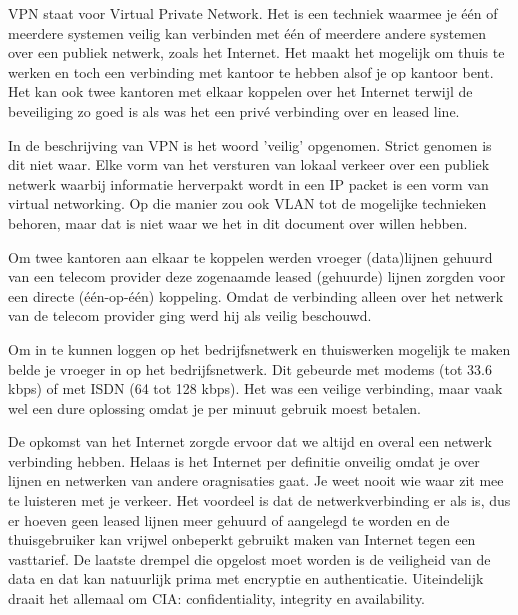VPN staat voor Virtual Private Network. Het is een techniek waarmee je \'e\'en of meerdere systemen veilig kan verbinden met \'e\'en of meerdere andere systemen over een publiek netwerk, zoals het Internet. Het maakt het mogelijk om thuis te werken en toch een verbinding met kantoor te hebben alsof je op kantoor bent. Het kan ook twee kantoren met elkaar koppelen over het Internet terwijl de beveiliging zo goed is als was het een priv\'e verbinding over en leased line.

In de beschrijving van VPN is het woord 'veilig' opgenomen. Strict genomen is dit niet waar. Elke vorm van het versturen van lokaal verkeer over een publiek netwerk waarbij informatie herverpakt wordt in een IP packet is een vorm van virtual networking. Op die manier zou ook VLAN tot de mogelijke technieken behoren, maar dat is niet waar we het in dit document over willen hebben.

Om twee kantoren aan elkaar te koppelen werden vroeger (data)lijnen gehuurd van een telecom provider deze zogenaamde leased (gehuurde) lijnen zorgden voor een directe (\'e\'en-op-\'e\'en) koppeling. Omdat de verbinding alleen over het netwerk van de telecom provider ging werd hij als veilig beschouwd.

Om in te kunnen loggen op het bedrijfsnetwerk en thuiswerken mogelijk te maken belde je vroeger in op het bedrijfsnetwerk. Dit gebeurde met modems (tot 33.6 kbps) of met ISDN (64 tot 128 kbps). Het was een veilige verbinding, maar vaak wel een dure oplossing omdat je per minuut gebruik moest betalen.

De opkomst van het Internet zorgde ervoor dat we altijd en overal een netwerk verbinding hebben. Helaas is het Internet per definitie onveilig omdat je over lijnen en netwerken van andere oragnisaties gaat. Je weet nooit wie waar zit mee te luisteren met je verkeer. Het voordeel is dat de netwerkverbinding er als is, dus er hoeven geen leased lijnen meer gehuurd of aangelegd te worden en de thuisgebruiker kan vrijwel onbeperkt gebruikt maken van Internet tegen een vasttarief. De laatste drempel die opgelost moet worden is de veiligheid van de data en dat kan natuurlijk prima met encryptie en authenticatie. Uiteindelijk draait het allemaal om CIA: confidentiality, integrity en availability.
